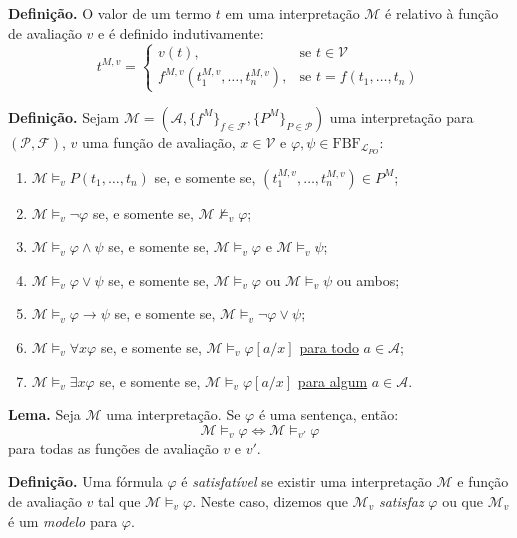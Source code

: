         \textbf{Definição.} O valor de um termo $t$ em uma interpretação $\mathcal{M}$ é relativo à função de avaliação $v$ e é definido indutivamente:
        \[
            t^{M,v} =
            \begin{cases}
                v(t), & \text{se } t \in \mathcal{V} \\
                f^{M,v}(t_1^{M,v}, \ldots, t_n^{M,v}), & \text{se } t = f(t_1, \ldots, t_n)
            \end{cases}
        \]

        \textbf{Definição.} Sejam $\mathcal{M} = (\mathcal{A}, \{f^M\}_{f \in \mathcal{F}}, \{P^M\}_{P \in \mathcal{P}})$ uma interpretação para $(\mathcal{P}, \mathcal{F})$, $v$ uma 
        função de avaliação, $x \in \mathcal{V}$ e $\varphi, \psi \in \text{FBF}_{\mathcal{L}_{PO}}$:
        \begin{enumerate}[left=0.5cm, align=left, nosep]
            \item $\mathcal{M} \models_v P(t_1, \ldots, t_n)$ se, e somente se, $(t_1^{M,v}, \ldots, t_n^{M,v}) \in P^M$;
            \item $\mathcal{M} \models_v \neg \varphi$ se, e somente se, $\mathcal{M} \not\models_v \varphi$;
            \item $\mathcal{M} \models_v \varphi \land \psi$ se, e somente se, $\mathcal{M} \models_v \varphi$ e $\mathcal{M} \models_v \psi$;
            \item $\mathcal{M} \models_v \varphi \lor \psi$ se, e somente se, $\mathcal{M} \models_v \varphi$ ou $\mathcal{M} \models_v \psi$ ou ambos;
            \item $\mathcal{M} \models_v \varphi \rightarrow \psi$ se, e somente se, $\mathcal{M} \models_v \neg \varphi \lor \psi$;
            \item $\mathcal{M} \models_v \forall x \varphi$ se, e somente se, $\mathcal{M} \models_v \varphi[a/x]$ \underline{para todo} $a \in \mathcal{A}$;
            \item $\mathcal{M} \models_v \exists x \varphi$ se, e somente se, $\mathcal{M} \models_v \varphi[a/x]$ \underline{para algum} $a \in \mathcal{A}$.
        \end{enumerate}

        \textbf{Lema.} Seja $\mathcal{M}$ uma interpretação. Se $\varphi$ é uma sentença, então:
        \[
            \mathcal{M} \models_v \varphi \iff \mathcal{M} \models_{v'} \varphi
        \]
        para todas as funções de avaliação $v$ e $v'$.

        \textbf{Definição.} Uma fórmula $\varphi$ é \textit{satisfatível} se existir uma interpretação $\mathcal{M}$ e função de 
        avaliação $v$ tal que $\mathcal{M} \models_v \varphi$. Neste caso, dizemos que $\mathcal{M}_v$ \textit{satisfaz} $\varphi$ ou que $\mathcal{M}_v$ 
        é um \textit{modelo} para $\varphi$.

